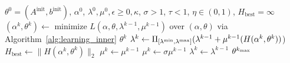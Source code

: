 \documentclass[11pt]{article}
\newcommand{\bsnote}[1]{\noindent\textcolor{red}{\texttt{Bartolomeo: #1}}}
\begin{document}
\begin{algorithm}[ht]
	\caption{Safeguarded stochastic augmented Lagrangian algorithm to solve~\eqref{eq:bilevel_sampled}}
	\label{alg:learning}
	\begin{algorithmic}[1]
	  $\theta^0 = (A^{\text{init}},b^{\text{init}})$, $\alpha^0$, $\lambda^0, \mu^0,\epsilon \geq 0,\kappa$, $\sigma > 1$, $\tau < 1$, $\eta \in (0,1)$, $H_{\text{best}} = \infty$
  \State $(\alpha^{k}, \theta^{k}) \gets$ minimize $L(\alpha, \theta, \lambda^{k-1}, \mu^{k-1})$ over $(\alpha, \theta)$ via Algorithm~\ref{alg:learning_inner}
   $\theta^{k}$ 
	 \State $\lambda^{k} \gets  \Pi_{[{\lambda^{\rm{min}}}, \lambda^{\rm{max}}]}(\lambda^{k-1} + \mu^{k-1}(H(\alpha^{k},\theta^{k}))$) 
    \State $H_{\text{best}} \gets \|H(\alpha^{k},\theta^{k}) \|_2$
    \State $\mu^{k} \gets  \mu^{k-1}$
    \Else
	 \State $\mu^{k} \gets  \sigma\mu^{k-1}$ 
    \State $\lambda^{k} \gets \lambda^{k-1}$
    \EndIf
	 \EndFor
	  $\theta^{k_{\rm max}}$
	\end{algorithmic}
\end{algorithm} 
\end{document}

